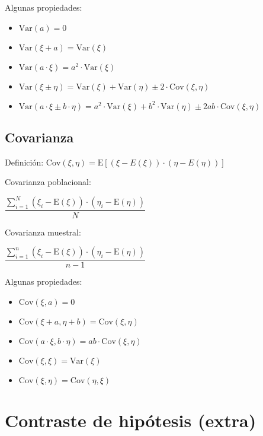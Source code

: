 \documentclass[10pt, a4paper, landscape]{extarticle}
\newcommand{\E}{\mathrm{E}}
\newcommand{\Var}{\mathrm{Var}}
\newcommand{\Cov}{\mathrm{Cov}}
\begin{document}
\begin{multicols}{3}
Algunas propiedades:

\begin{itemize}[leftmargin=*]
	\item $\Var(a) = 0$
	\item $\Var(\xi + a) = \Var(\xi)$
	\item $\Var(a \cdot \xi) = a^2 \cdot \Var(\xi)$
	\item $\Var(\xi \pm \eta) = \Var(\xi) + \Var(\eta) \pm 2 \cdot \Cov(\xi, \eta)$
	\item $\Var(a \cdot \xi \pm b \cdot \eta) = a^2 \cdot \Var(\xi) + b^2 \cdot \Var(\eta) \pm 2 a b \cdot \Cov(\xi, \eta)$
\end{itemize}

\subsection*{Covarianza}

Definición: \quad $\Cov(\xi, \eta) = \E[(\xi - E(\xi)) \cdot (\eta - E(\eta))]$

\begin{multicols}{2}
	Covarianza poblacional:
	\begin{center}
		$\dfrac{\sum_{i=1}^{N} (\xi_i - \E(\xi)) \cdot (\eta_i - \E(\eta))}{N}$
	\end{center}
\columnbreak
	Covarianza muestral:
	\begin{center}
		$\dfrac{\sum_{i=1}^{n} (\xi_i - \E(\xi)) \cdot (\eta_i - \E(\eta))}{n - 1}$
	\end{center}
\end{multicols}

Algunas propiedades:

\begin{itemize}[leftmargin=*]
	\item $\Cov(\xi, a) = 0$
	\item $\Cov(\xi + a, \eta + b) = \Cov(\xi, \eta)$
	\item $\Cov(a \cdot \xi, b \cdot \eta) = a b \cdot \Cov(\xi, \eta)$
	\item $\Cov(\xi, \xi) = \Var(\xi)$
	\item $\Cov(\xi, \eta) = \Cov(\eta, \xi)$
\end{itemize}

\pagebreak

\section*{Contraste de hipótesis (extra)}


\end{multicols}
\end{document}
